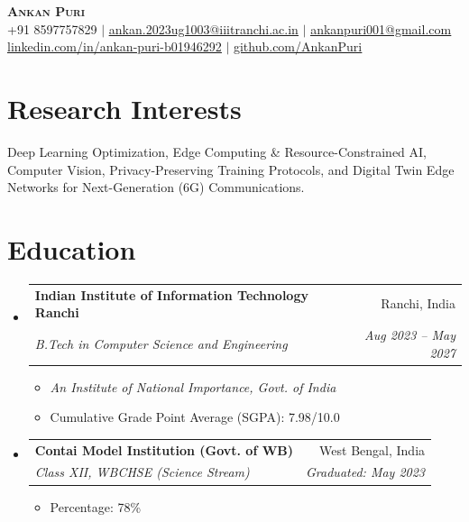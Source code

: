 \documentclass[10pt, a4paper]{article}
\makeatletter
\newcommand{\resumeSubheading}[4]{
  \vspace{-1pt}\item
    \begin{tabular*}{0.97\textwidth}[t]{l@{\extracolsep{\fill}}r}
      \textbf{#1} & #2 \\
      \textit{\small#3} & \textit{\small #4} \\
    \end{tabular*}\vspace{-5pt}
}
\makeatother
\begin{document}
\begin{center}
    \textbf{\Huge \scshape Ankan Puri} \\ \vspace{5pt}
    \small +91 8597757829 $|$ \href{mailto:ankan.2023ug1003@iiitranchi.ac.in}{\underline{ankan.2023ug1003@iiitranchi.ac.in}} $|$ \href{mailto:ankanpuri001@gmail.com}{\underline{ankanpuri001@gmail.com}} \\
    \href{https://www.linkedin.com/in/ankan-puri-b01946292/}{\underline{linkedin.com/in/ankan-puri-b01946292}} $|$ \href{https://github.com/AnkanPuri}{\underline{github.com/AnkanPuri}}
\end{center}

\section{Research Interests}
Deep Learning Optimization, Edge Computing \& Resource-Constrained AI, Computer Vision, Privacy-Preserving Training Protocols, and Digital Twin Edge Networks for Next-Generation (6G) Communications.

\section{Education}
  \begin{itemize}[leftmargin=0.15in, label={}]
    \resumeSubheading
      {Indian Institute of Information Technology Ranchi}{Ranchi, India}
      {B.Tech in Computer Science and Engineering}{Aug 2023 -- May 2027}
      \vspace{2pt}
      \begin{itemize}[leftmargin=0.2in, label={\textbullet}]
        \small\item \textit{An Institute of National Importance, Govt. of India}
        \small\item Cumulative Grade Point Average (SGPA): 7.98/10.0
      \end{itemize}
    \resumeSubheading
      {Contai Model Institution (Govt. of WB)}{West Bengal, India}
      {Class XII, WBCHSE (Science Stream)}{Graduated: May 2023}
      \vspace{2pt}
      \begin{itemize}[leftmargin=0.2in, label={\textbullet}]
        \small\item Percentage: 78\%
      \end{itemize}
  \end{itemize}
\end{document}

